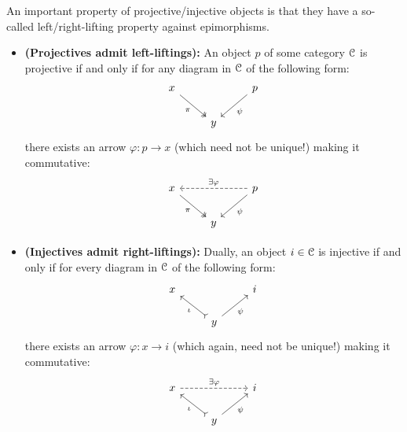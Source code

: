             An important property of projective/injective objects is that they have a so-called left/right-lifting property against epimorphisms. 
            \begin{proposition} \label{prop: projectives_and_injectives_lifting_property}
                \noindent
                \begin{itemize}
                    \item\textbf{(Projectives admit left-liftings):} An object $p$ of some category $\mathcal{C}$ is projective if and only if for any diagram in $\mathcal{C}$ of the following form:
                        $$
                            \begin{tikzcd}
                            	x && p \\
                            	& y
                            	\arrow["\pi"', two heads, from=1-1, to=2-2]
                            	\arrow["\psi", from=1-3, to=2-2]
                            \end{tikzcd}
                        $$
                    there exists an arrow $\varphi: p \to x$ (which need not be unique!) making it commutative:
                        $$
                            \begin{tikzcd}
                            	x && p \\
                            	& y
                            	\arrow["\pi"', two heads, from=1-1, to=2-2]
                            	\arrow["\psi", from=1-3, to=2-2]
                            	\arrow["{\exists \varphi}"', dashed, from=1-3, to=1-1]
                            \end{tikzcd}
                        $$
                    \item \textbf{(Injectives admit right-liftings):} Dually, an object $i \in \mathcal{C}$ is injective if and only if for every diagram in $\mathcal{C}$ of the following form:
                        $$
                            \begin{tikzcd}
                            	x && i \\
                            	& y
                            	\arrow["\iota", tail, from=2-2, to=1-1]
                            	\arrow["\psi"', from=2-2, to=1-3]
                            \end{tikzcd}
                        $$
                    there exists an arrow $\varphi: x \to i$ (which again, need not be unique!) making it commutative:
                        $$
                            \begin{tikzcd}
                            	x && i \\
                            	& y
                            	\arrow["\iota", tail, from=2-2, to=1-1]
                            	\arrow["\psi"', from=2-2, to=1-3]
                            	\arrow["{\exists \varphi}", dashed, from=1-1, to=1-3]
                            \end{tikzcd}
                        $$
                \end{itemize}
            \end{proposition}
